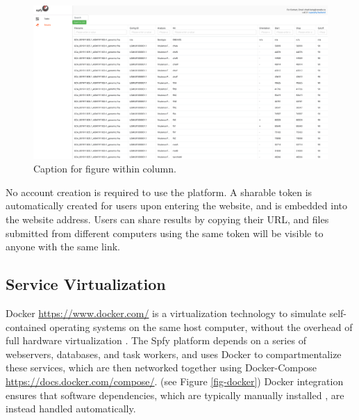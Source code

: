 \documentclass{article}
\begin{document}
\begin{figure}[!hb]
\begin{center}
\includegraphics[width=\textwidth]{images/tables.png}
\end{center}
\caption{Caption for figure within column.}
\label{fig-tables}
\end{figure}

No account creation is required to use the platform. A sharable token is automatically created for users upon entering the website, and is embedded into the website address. Users can share results by copying their URL, and files submitted from different computers using the same token will be visible to anyone with the same link.

\subsection{Service Virtualization}



Docker \url{https://www.docker.com/} is a virtualization technology to simulate self-contained operating systems on the same host computer, without the overhead of full hardware virtualization \cite{felter2015updated}.
The Spfy platform depends on a series of webservers, databases, and task workers, and uses Docker to compartmentalize these services, which are then networked together using Docker-Compose \url{https://docs.docker.com/compose/}.
(see Figure \ref{fig-docker})
Docker integration ensures that software dependencies, which are typically manually installed \cite{doi:10.1093/bioinformatics/btu153,laing2010pan,inouye2014srst2,naccache2014cloud}, are instead handled automatically.
\end{document}
